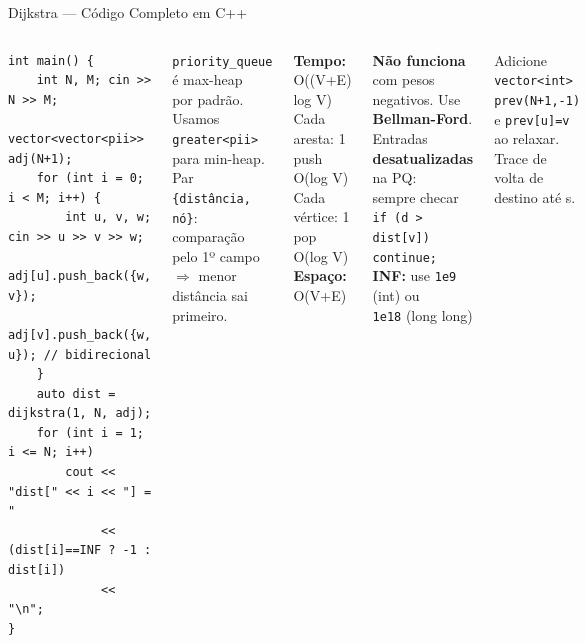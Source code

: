 \documentclass[aspectratio=169,10pt]{beamer}
\begin{document}
\begin{frame}[fragile,shrink=3]{Dijkstra --- Código Completo em C++}
\begin{columns}[t]
\begin{tcolorbox}[caixaCodigo]
\begin{lstlisting}[style=cppsmall]
int main() {
    int N, M; cin >> N >> M;
    vector<vector<pii>> adj(N+1);
    for (int i = 0; i < M; i++) {
        int u, v, w; cin >> u >> v >> w;
        adj[u].push_back({w, v});
        adj[v].push_back({w, u}); // bidirecional
    }
    auto dist = dijkstra(1, N, adj);
    for (int i = 1; i <= N; i++)
        cout << "dist[" << i << "] = "
             << (dist[i]==INF ? -1 : dist[i])
             << "\n";
}
        \end{lstlisting}
      \end{tcolorbox}
      \begin{tcolorbox}[caixaRoxa,title={Por que min-heap com pares?}]
        \footnotesize
        \texttt{priority\_queue} é max-heap\\por padrão. Usamos\\
        \texttt{greater<pii>} para min-heap.\\[4pt]
        Par \texttt{\{distância, nó\}}:\\
        comparação pelo 1º campo\\
        $\Rightarrow$ menor distância sai primeiro.
      \end{tcolorbox}
      \vspace{0.07cm}
      \begin{tcolorbox}[caixaVerde,title={Complexidade}]
        \footnotesize
        \textbf{Tempo:} O((V+E) log V)\\
        Cada aresta: 1 push O(log V)\\
        Cada vértice: 1 pop O(log V)\\[3pt]
        \textbf{Espaço:} O(V+E)
      \end{tcolorbox}
      \vspace{0.07cm}
      \begin{tcolorbox}[caixaVermelho,title={Cuidados}]
        \footnotesize
        \textbf{Não funciona} com pesos\\negativos. Use \textbf{Bellman-Ford}.\\[3pt]
        Entradas \textbf{desatualizadas} na PQ:\\
        sempre checar\\
        \texttt{if (d > dist[v]) continue;}\\[3pt]
        \textbf{INF:} use \texttt{1e9} (int) ou\\
        \texttt{1e18} (long long)
      \end{tcolorbox}
      \vspace{0.07cm}
      \begin{tcolorbox}[caixaAmarelo,title={Reconstruir caminho}]
        \footnotesize
        Adicione \texttt{vector<int> prev(N+1,-1)}\\
        e \texttt{prev[u]=v} ao relaxar.\\
        Trace de volta de destino até s.
      \end{tcolorbox}
  \end{columns}
\end{frame}
\end{document}
